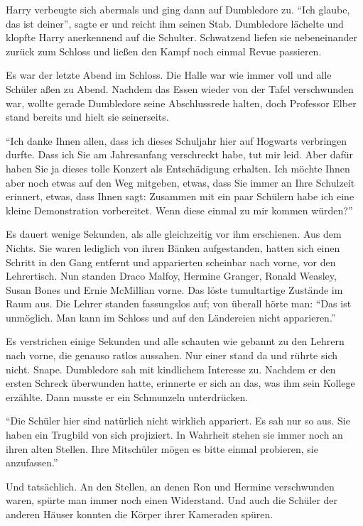 Harry verbeugte sich abermals und ging dann auf Dumbledore zu. \enquote{Ich glaube, das ist deiner}, sagte er und reicht ihm seinen Stab. Dumbledore lächelte und klopfte Harry anerkennend auf die Schulter. Schwatzend liefen sie nebeneinander zurück zum Schloss und ließen den Kampf noch einmal Revue passieren.

\trenn

Es war der letzte Abend im Schloss. Die Halle war wie immer voll und alle Schüler aßen zu Abend. Nachdem das Essen wieder von der Tafel verschwunden war, wollte gerade Dumbledore seine Abschlussrede halten, doch Professor Elber stand bereits und hielt sie seinerseits.

\enquote{Ich danke Ihnen allen, dass ich dieses Schuljahr hier auf Hogwarts verbringen durfte. Dass ich Sie am Jahresanfang verschreckt habe, tut mir leid. Aber dafür haben Sie ja dieses tolle Konzert als Entschädigung erhalten. Ich möchte Ihnen aber noch etwas auf den Weg mitgeben, etwas, dass Sie immer an Ihre Schulzeit erinnert, etwas, dass Ihnen sagt:  Zusammen mit ein paar Schülern habe ich eine kleine Demonstration vorbereitet. Wenn diese einmal zu mir kommen würden?}

Es dauert wenige Sekunden, als alle gleichzeitig vor ihm erschienen. Aus dem Nichts. Sie waren lediglich von ihren Bänken aufgestanden, hatten sich einen Schritt in den Gang entfernt und apparierten scheinbar nach vorne, vor den Lehrertisch. Nun standen Draco Malfoy, Hermine Granger, Ronald Weasley, Susan Bones und Ernie McMillian vorne. Das löste tumultartige Zustände im Raum aus. Die Lehrer standen fassungslos auf; von überall hörte man: \enquote{Das ist unmöglich. Man kann im Schloss und auf den Ländereien nicht apparieren.}

Es verstrichen einige Sekunden und alle schauten wie gebannt zu den Lehrern nach vorne, die genauso ratlos aussahen. Nur einer stand da und rührte sich nicht. Snape. Dumbledore sah mit kindlichem Interesse zu. Nachdem er den ersten Schreck überwunden hatte, erinnerte er sich an das, was ihm sein Kollege erzählte.  Dann musste er ein Schmunzeln unterdrücken.

\enquote{Die Schüler hier sind natürlich nicht wirklich appariert. Es sah nur so aus. Sie haben ein Trugbild von sich projiziert. In Wahrheit stehen sie immer noch an ihren alten Stellen. Ihre Mitschüler mögen es bitte einmal probieren, sie anzufassen.}

Und tatsächlich. An den Stellen, an denen Ron und Hermine verschwunden waren, spürte man immer noch einen Widerstand. Und auch die Schüler der anderen Häuser konnten die Körper ihrer Kameraden spüren.

